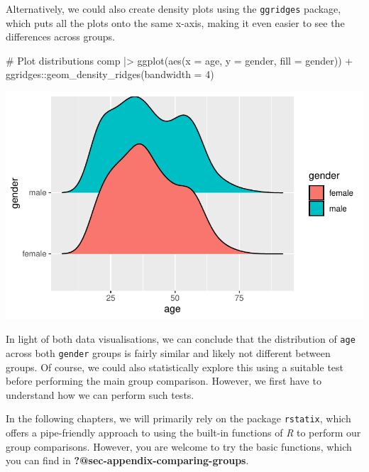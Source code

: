 \documentclass[
  letterpaper,
]{krantz}
\makeatletter
\newenvironment{Shaded}{\begin{snugshade}}{\end{snugshade}}
\newcommand{\AttributeTok}[1]{\textcolor[rgb]{0.40,0.45,0.13}{#1}}
\newcommand{\CommentTok}[1]{\textcolor[rgb]{0.37,0.37,0.37}{#1}}
\newcommand{\DecValTok}[1]{\textcolor[rgb]{0.68,0.00,0.00}{#1}}
\newcommand{\FunctionTok}[1]{\textcolor[rgb]{0.28,0.35,0.67}{#1}}
\newcommand{\NormalTok}[1]{\textcolor[rgb]{0.00,0.23,0.31}{#1}}
\newcommand{\SpecialCharTok}[1]{\textcolor[rgb]{0.37,0.37,0.37}{#1}}
\newenvironment{kframe}{%
\medskip{}
\setlength{\fboxsep}{.8em}
 \def\at@end@of@kframe{}%
 \ifinner\ifhmode%
  \def\at@end@of@kframe{\end{minipage}}%
  \begin{minipage}{\columnwidth}%
 \fi\fi%
 \def\FrameCommand##1{\hskip\@totalleftmargin \hskip-\fboxsep
 \colorbox{shadecolor}{##1}\hskip-\fboxsep
     \hskip-\linewidth \hskip-\@totalleftmargin \hskip\columnwidth}%
 \MakeFramed {\advance\hsize-\width
   \@totalleftmargin\z@ \linewidth\hsize
   \@setminipage}}%
 {\par\unskip\endMakeFramed%
 \at@end@of@kframe}
\renewenvironment{Shaded}{\begin{kframe}}{\end{kframe}}
\makeatother
\begin{document}
Alternatively, we could also create density plots using the
\texttt{ggridges} package, which puts all the plots onto the same
x-axis, making it even easier to see the differences across groups.

\begin{Shaded}
\begin{Highlighting}[]
\CommentTok{\# Plot distributions}
\NormalTok{comp }\SpecialCharTok{|\textgreater{}}
  \FunctionTok{ggplot}\NormalTok{(}\FunctionTok{aes}\NormalTok{(}\AttributeTok{x =}\NormalTok{ age,}
             \AttributeTok{y =}\NormalTok{ gender,}
             \AttributeTok{fill =}\NormalTok{ gender)) }\SpecialCharTok{+}
\NormalTok{  ggridges}\SpecialCharTok{::}\FunctionTok{geom\_density\_ridges}\NormalTok{(}\AttributeTok{bandwidth =} \DecValTok{4}\NormalTok{)}
\end{Highlighting}
\end{Shaded}

\includegraphics{11_group_comparison_files/figure-pdf/comparability-of-egyptians-plot-1.pdf}

In light of both data visualisations, we can conclude that the
distribution of \texttt{age} across both \texttt{gender} groups is
fairly similar and likely not different between groups. Of course, we
could also statistically explore this using a suitable test before
performing the main group comparison. However, we first have to
understand how we can perform such tests.

In the following chapters, we will primarily rely on the package
\texttt{rstatix}, which offers a pipe-friendly approach to using the
built-in functions of \emph{R} to perform our group comparisons.
However, you are welcome to try the basic functions, which you can find
in \textbf{?@sec-appendix-comparing-groups}.
\end{document}
